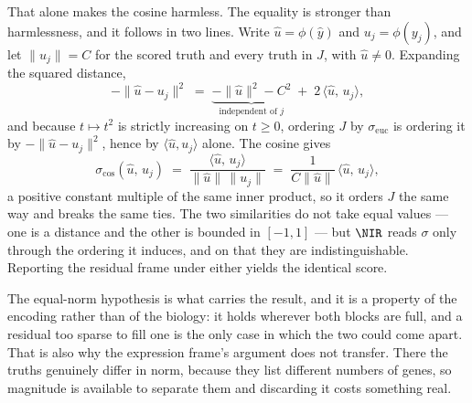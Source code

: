 That alone makes the cosine harmless. The equality is stronger than harmlessness,
and it follows in two lines. Write $\hat{u} = \phi(\hat{y})$ and $u_j =
\phi(y_j)$, and let $\lVert u_j \rVert = C$ for the scored truth and every truth
in $J$, with $\hat{u} \neq 0$. Expanding the squared distance,
\begin{equation}
 -\lVert \hat{u} - u_j \rVert^{2}
 \;=\; \underbrace{-\lVert \hat{u} \rVert^{2} - C^{2}}_{\text{independent of } j}
 \;+\; 2\,\langle \hat{u},\, u_j \rangle ,
\end{equation}
and because $t \mapsto t^{2}$ is strictly increasing on $t \geq 0$, ordering $J$
by $\sigma_{\mathrm{euc}}$ is ordering it by $-\lVert \hat{u} - u_j \rVert^{2}$,
hence by $\langle \hat{u}, u_j \rangle$ alone. The cosine gives
\begin{equation}
 \sigma_{\cos}(\hat{u},\, u_j)
 \;=\; \frac{\langle \hat{u},\, u_j \rangle}
            {\lVert \hat{u} \rVert \, \lVert u_j \rVert}
 \;=\; \frac{1}{C \lVert \hat{u} \rVert}\,\langle \hat{u},\, u_j \rangle ,
\end{equation}
a positive constant multiple of the same inner product, so it orders $J$ the same
way and breaks the same ties. The two similarities do not take equal values ---
one is a distance and the other is bounded in $[-1, 1]$ --- but $\NIR$ reads
$\sigma$ only through the ordering it induces, and on that they are
indistinguishable. Reporting the residual frame under either yields the identical
score.

The equal-norm hypothesis is what carries the result, and it is a property of the
encoding rather than of the biology: it holds wherever both blocks are full, and a
residual too sparse to fill one is the only case in which the two could come
apart. That is also why the expression frame's argument does not transfer.
There the truths genuinely differ in norm, because they list different numbers of
genes, so magnitude is available to separate them and discarding it costs
something real.

